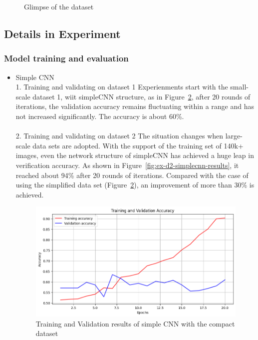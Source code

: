 \documentclass[final]{cvpr}
\begin{document}
\begin{itemize}
\begin{figure}[t]
\begin{minipage}{0.45\linewidth}
   \label{fig:image2}
\end{minipage}
\caption{Glimpse of the dataset}
\label{fig:dataset}
\end{figure}
\end{itemize}


\subsection{Details in Experiment}
\subsubsection{Model training and evaluation}
\begin{itemize}
   \item Simple CNN \\
   1. Training and validating on dataset 1
       Experienments start with the small-scale dataset 1, wiit simpleCNN structure, as in Figure~\ref*{fig:ex-d1-simplecnn-results}, after 20 rounds of iterations, the validation accuracy remains fluctuating within a range and has not increased significantly. The accuracy is about 60\%.  
       \\
       \\
   2. Training and validating on dataset 2
       The situation changes when large-scale data sets are adopted. With the support of the training set of 140k+ images, even the network structure of simpleCNN has achieved a huge leap in verification accuracy. As shown in Figure~\ref*{fig:ex-d2-simplecnn-results}, it reached about 94\% after 20 rounds of iterations. Compared with the case of using the simplified data set (Figure~\ref*{fig:ex-d1-simplecnn-results}), an improvement of more than 30\% is achieved.
       

       \begin{figure}[t]
          \centering
          \includegraphics[width=0.9\linewidth]{images/ex-d1-simplecnn-accuracy-results.png}
          \caption{Training and Validation results of simple CNN with the compact dataset}
          \label{fig:ex-d1-simplecnn-results}
       \end{figure}
       

\end{itemize}
\end{document}
